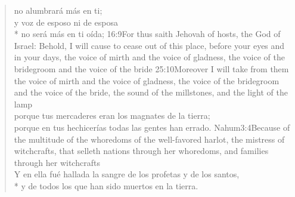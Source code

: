 \begin{verse}
no alumbrará más en ti;\\
y voz de esposo ni de esposa\\*\vin
no será más en ti oída;%
					{16:9}{For thus saith Jehovah of hosts, the God of Israel: Behold, I will cause to cease out of this place, before your eyes and in your days, the voice of mirth and the voice of gladness, the voice of the bridegroom and the voice of the bride}%
					{25:10}{Moreover I will take from them the voice of mirth and the voice of gladness, the voice of the bridegroom and the voice of the bride, the sound of the millstones, and the light of the lamp}\\
 porque tus mercaderes eran los magnates de la tierra;%
	\\
 porque en tus hechicerías todas las gentes han errado.%
				{Nahum}{3:4}{Because of the multitude of the whoredoms of the well-favored harlot, the mistress of witchcrafts, that selleth nations through her whoredoms, and families through her witchcrafts}\\
Y en ella fué hallada la sangre de los profetas y de los santos,\\*\vin
y de todos los que han sido muertos en la tierra.%
\end{verse}
